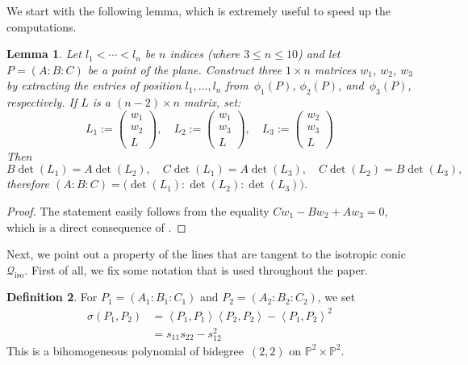 \documentclass[a4paper, 11pt, reqno]{amsart}
\theoremstyle{plain}
\newtheorem{lemma}{Lemma}[section]
\theoremstyle{definition}
\newtheorem{definition}[lemma]{Definition}
\newcommand{\p}{\mathbb{P}}
\newcommand{\iso}{\mathcal{Q}_{\mathrm{iso}}}
\newcommand{\scl}[2]{\left\langle {#1}, {#2} \right\rangle}
\begin{document}
We start with the following lemma, which is extremely useful
to speed up the computations.

\begin{lemma}
\label{lemma:minors}
Let $l_1 < \cdots <l_n$ be $n$ indices (where $3 \leq n \leq 10$) and let $P = (A: B: C)$ be a point of the plane.
Construct three $1 \times n$ matrices $w_1$, $w_2$, $w_3$ by extracting the entries of position $l_1, \dotsc, l_n$ from~$\phi_1(P)$, $\phi_2(P)$, and~$\phi_3(P)$, respectively. If $L$ is a $(n-2) \times n$ matrix, set:
%
\[
  L_1 := \left( \begin{array}{c} w_1 \\ w_2 \\ L \end{array} \right), \quad
  L_2 := \left( \begin{array}{c} w_1 \\ w_3 \\ L \end{array} \right), \quad
  L_3 := \left( \begin{array}{c} w_2 \\ w_3 \\ L \end{array} \right)
\]
%
Then
%
\[
  B \det(L_1) = A \det(L_2), \quad
  C \det(L_1) = A \det(L_3), \quad
  C \det(L_2) = B \det(L_3),
\]
%
therefore $(A: B: C) = \bigl( \det(L_1): \det(L_2): \det(L_3) \bigr)$.
\end{lemma}
\begin{proof}
The statement easily follows from the equality $C w_1 - B w_2 + A w_3 = 0$, which is a direct consequence of .
\end{proof}

Next, we point out a property of the lines that are tangent to the isotropic conic~$\iso$.
First of all, we fix some notation that is used throughout the paper.

\begin{definition}
\label{definition:sigma}
For $P_1 = (A_1: B_1: C_1)$ and $P_2 = (A_2: B_2: C_2)$, we set
%
\begin{equation}
\label{formula:sigma}
\begin{aligned}
  \sigma(P_1, P_2) &= \scl{P_1}{P_1} \scl{P_2}{P_2} - \scl{P_1}{P_2}^2 \\
   &= s_{11}s_{22}-s_{12}^2
\end{aligned}
\end{equation}
%
This is a bihomogeneous polynomial of bidegree~$(2,2)$ on $\p^2 \times \p^2$.
\end{definition}
\end{document}
